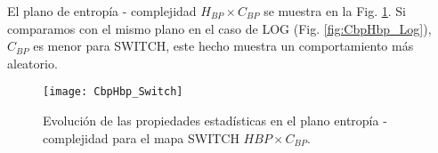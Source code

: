 El plano de entropía - complejidad $H_{BP} \times C_{BP}$ se muestra en la Fig. \ref{fig:SWITCH_HC}.
Si comparamos con el mismo plano en el caso de LOG (Fig. \ref{fig:CbpHbp_Log}), $C_{BP}$ es menor para SWITCH, este hecho muestra un comportamiento más aleatorio.
%
\begin{figure}[htpb]
	\centering
	\texttt{[image: CbpHbp\_Switch]}
	\caption{Evolución de las propiedades estadísticas en el plano entropía - complejidad para el mapa SWITCH $H{BP} \times C_{BP}$.}
	\label{fig:SWITCH_HC}
\end{figure}